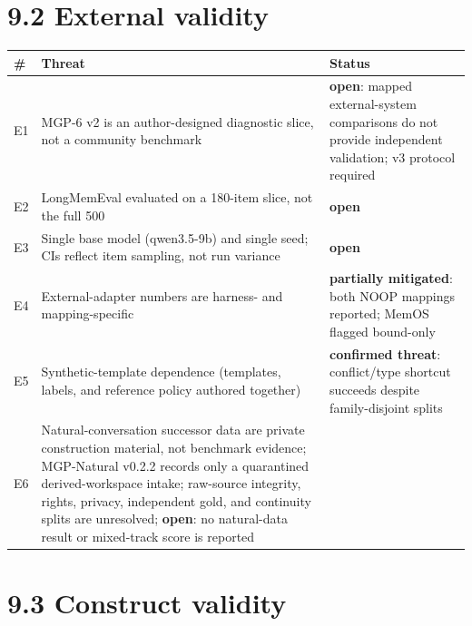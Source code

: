 \section{9.2 External validity}\label{external-validity}

{\def\LTcaptype{none} %
\begin{longtable}[]{@{}
  >{\raggedright\arraybackslash}p{}
  >{\raggedright\arraybackslash}p{}
  >{\raggedright\arraybackslash}p{}@{}}
\toprule\noalign{}
\begin{minipage}[b]{\linewidth}\raggedright
\#
\end{minipage} & \begin{minipage}[b]{\linewidth}\raggedright
Threat
\end{minipage} & \begin{minipage}[b]{\linewidth}\raggedright
Status
\end{minipage} \\
\midrule\noalign{}
\endhead
\bottomrule\noalign{}
\endlastfoot
E1 & MGP-6 v2 is an author-designed diagnostic slice, not a community
benchmark & \textbf{open}: mapped external-system comparisons do not
provide independent validation; v3 protocol required \\
E2 & LongMemEval evaluated on a 180-item slice, not the full 500 &
\textbf{open} \\
E3 & Single base model (qwen3.5-9b) and single seed; CIs reflect item
sampling, not run variance & \textbf{open} \\
E4 & External-adapter numbers are harness- and mapping-specific &
\textbf{partially mitigated}: both NOOP mappings reported; MemOS flagged
bound-only \\
E5 & Synthetic-template dependence (templates, labels, and reference
policy authored together) & \textbf{confirmed threat}: conflict/type
shortcut succeeds despite family-disjoint splits \\
E6 & Natural-conversation successor data are private construction material,
not benchmark evidence; MGP-Natural v0.2.2 records only a quarantined
derived-workspace intake; raw-source integrity, rights, privacy, independent
gold, and continuity splits are unresolved; \textbf{open}: no natural-data
result or mixed-track score is reported \\
\end{longtable}
}

\section{9.3 Construct validity}\label{construct-validity}

